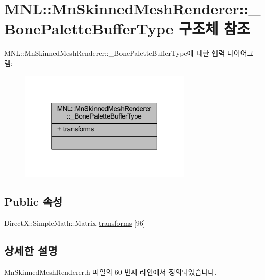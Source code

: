 \hypertarget{struct_m_n_l_1_1_mn_skinned_mesh_renderer_1_1___bone_palette_buffer_type}{}\section{M\+NL\+:\+:Mn\+Skinned\+Mesh\+Renderer\+:\+:\+\_\+\+Bone\+Palette\+Buffer\+Type 구조체 참조}
\label{struct_m_n_l_1_1_mn_skinned_mesh_renderer_1_1___bone_palette_buffer_type}


M\+NL\+:\+:Mn\+Skinned\+Mesh\+Renderer\+:\+:\+\_\+\+Bone\+Palette\+Buffer\+Type에 대한 협력 다이어그램\+:\nopagebreak
\begin{figure}[H]
\begin{center}
\leavevmode
\includegraphics[width=235pt]{struct_m_n_l_1_1_mn_skinned_mesh_renderer_1_1___bone_palette_buffer_type__coll__graph}
\end{center}
\end{figure}
\subsection*{Public 속성}
\begin{DoxyCompactItemize}
\item 
Direct\+X\+::\+Simple\+Math\+::\+Matrix \hyperlink{struct_m_n_l_1_1_mn_skinned_mesh_renderer_1_1___bone_palette_buffer_type_a2b96ca83d6a5261a4dacaa4089704b22}{transforms} \mbox{[}96\mbox{]}
\end{DoxyCompactItemize}


\subsection{상세한 설명}


Mn\+Skinned\+Mesh\+Renderer.\+h 파일의 60 번째 라인에서 정의되었습니다.



